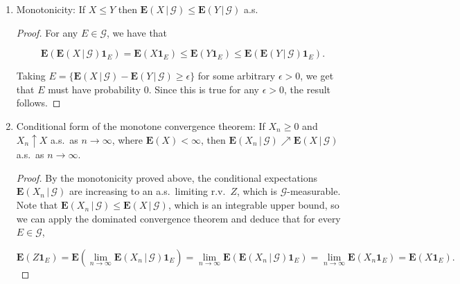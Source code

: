 \begin{enumerate}[label=\arabic*.]
\begin{proof}
\begin{align*}
\mathbf{E}(Z\mathbf{1}_E) &= a\mathbf{E}(\mathbf{E}\left(X\,|\,\mathcal{G}\right)\mathbf{1}_E)+b\mathbf{E}(\mathbf{E}\left(Y\,|\,\mathcal{G}\right)\mathbf{1}_E) =
a \mathbf{E}(X\mathbf{1}_E)+b\mathbf{E}(Y\mathbf{1}_E) \\&=\mathbf{E}((aX+bY)\mathbf{1}_E),
\end{align*}

\noindent so $Z$ satisfies the requirements that qualify it to
be the conditional expectation of $aX+bY$.
\end{proof}

\item Monotonicity: If $X\le Y$ then
$\mathbf{E}\left(X\,|\,\mathcal{G}\right)\le\mathbf{E}\left(Y\,|\,\mathcal{G}\right)$
a.s.

\begin{proof}
For any $E\in\mathcal{G}$, we have that

\[
\mathbf{E}(\mathbf{E}\left(X\,|\,\mathcal{G}\right)\mathbf{1}_E) = \mathbf{E}(X\mathbf{1}_E) \le
\mathbf{E}(Y\mathbf{1}_E) \le \mathbf{E}(\mathbf{E}\left(Y\,|\,\mathcal{G}\right)\mathbf{1}_E).
\]

\noindent Taking
$E=\{\mathbf{E}\left(X\,|\,\mathcal{G}\right)-\mathbf{E}\left(Y\,|\,\mathcal{G}\right)\ge
\epsilon\}$
for some arbitrary $\epsilon>0$, we get that $E$ must
have probability $0$. Since this is true for any
$\epsilon>0$, the result follows.
\end{proof}

\item Conditional form of the monotone convergence theorem:
If $X_n\ge 0$ and $X_n \uparrow X$ a.s.\ as
$n\to\infty$, where $\mathbf{E}(X)<\infty$, then
$\mathbf{E}\left(X_n\,|\,\mathcal{G}\right)\nearrow
\mathbf{E}\left(X\,|\,\mathcal{G}\right)$
a.s.\ as $n\to\infty$.

\begin{proof}
By the monotonicity proved above, the conditional
expectations
$\mathbf{E}\left(X_n\,|\,\mathcal{G}\right)$ are
increasing to an a.s.\ limiting r.v.\ $Z$, which is
$\mathcal{G}$-measurable. Note that
$\mathbf{E}\left(X_n\,|\,\mathcal{G}\right)\le
\mathbf{E}\left(X\,|\,\mathcal{G}\right)$,
which is an integrable upper bound, so we can apply
the dominated convergence theorem and deduce that for
every $E\in \mathcal{G}$,

\[
\mathbf{E}(Z\mathbf{1}_E) = \mathbf{E}(\lim_{n\to\infty} \mathbf{E}\left(X_n\,|\,\mathcal{G}\right)\mathbf{1}_E)
= \lim_{n\to\infty} \mathbf{E}(\mathbf{E}\left(X_n\,|\,\mathcal{G}\right)\mathbf{1}_E) = \lim_{n\to\infty} \mathbf{E}(X_n\mathbf{1}_E)
= \mathbf{E}(X\mathbf{1}_E).
\]


\end{proof}
\end{enumerate}
